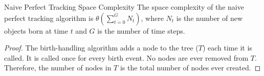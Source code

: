 \begin{theorem}{Naive Perfect Tracking Space Complexity}
\label{thm:perfect-tracking-space}
The space complexity of the naive perfect tracking algorithm is $\mathcal{\theta}(\sum_{t=0}^{G} N_t)$, where $N_t$ is the number of new objects born at time $t$ and $G$ is the number of time steps.
\end{theorem}

\begin{proof}
\label{prf:perfect-tracking-space}
The birth-handling algorithm adds a node to the tree ($T$) each time it is called.
It is called once for every birth event.
No nodes are ever removed from $T$.
Therefore, the number of nodes in $T$ is the total number of nodes ever created.
\end{proof}
